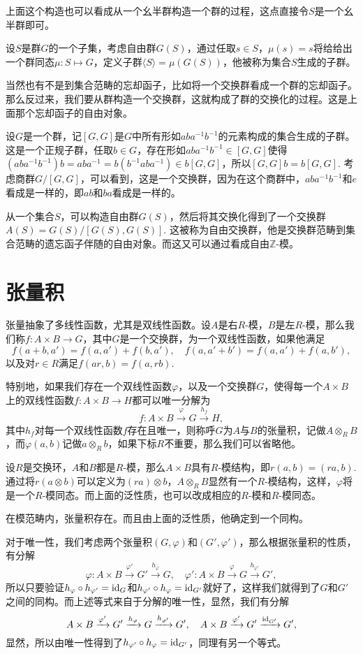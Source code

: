 上面这个构造也可以看成从一个幺半群构造一个群的过程，这点直接令$S$是一个幺半群即可。

\para 设$S$是群$G$的一个子集，考虑自由群$G(S)$，通过任取$s\in S$，$\mu(s)=s$将给给出一个群同态$\mu:S\mapsto G$，定义子群$\langle S\rangle=\mu(G(S))$，他被称为集合$S$生成的子群。

\para 当然也有不是到集合范畴的忘却函子，比如将一个交换群看成一个群的忘却函子。那么反过来，我们要从群构造一个交换群，这就构成了群的交换化的过程。这是上面那个忘却函子的自由对象。

设$G$是一个群，记$[G,G]$是$G$中所有形如$aba^{-1}b^{-1}$的元素构成的集合生成的子群。这是一个正规子群，任取$b\in G$，存在形如$aba^{-1}b^{-1}\in [G,G]$使得$(aba^{-1}b^{-1})b=aba^{-1}=b(b^{-1}aba^{-1})\in b[G,G]$，所以$[G,G]b=b[G,G]$. 考虑商群$G/[G,G]$，可以看到，这是一个交换群，因为在这个商群中，$aba^{-1}b^{-1}$和$e$看成是一样的，即$ab$和$ba$看成是一样的。

从一个集合$S$，可以构造自由群$G(S)$，然后将其交换化得到了一个交换群$A(S)=G(S)/[G(S),G(S)]$. 这被称为自由交换群，他是交换群范畴到集合范畴的遗忘函子伴随的自由对象。而这又可以通过看成自由$\mathbb{Z}$-模。

\section{张量积}

\para 张量抽象了多线性函数，尤其是双线性函数。设$A$是右$R$-模，$B$是左$R$-模，那么我们称$f:A\times B\to G$，其中$G$是一个交换群，为一个双线性函数，如果他满足
\[
	f(a+b,a')=f(a,a')+f(b,a'),\quad f(a,a'+b')=f(a,a')+f(a,b'),
\]
以及对$r\in R$满足$f(ar,b)=f(a,rb)$.

特别地，如果我们存在一个双线性函数$\varphi$，以及一个交换群$G$，使得每一个$A\times B$上的双线性函数$f:A\times B\to H$都可以唯一分解为
\[
	f:A\times B\xrightarrow{\varphi} G\xrightarrow{h_f}H,
\]
其中$h_f$对每一个双线性函数$f$存在且唯一，则称呼$G$为$A$与$B$的张量积，记做$A\otimes_R B$，而$\varphi(a,b)$记做$a\otimes_R b$，如果下标$R$不重要，那么我们可以省略他。

设$R$是交换环，$A$和$B$都是$R$-模，那么$A\times B$具有$R$-模结构，即$r(a,b)=(ra,b)$. 通过将$r(a\otimes b)$可以定义为$(ra)\otimes b$，$A\otimes_R B$显然有一个$R$-模结构，这样，$\varphi$将是一个$R$-模同态。而上面的泛性质，也可以改成相应的$R$-模和$R$-模同态。

\lem 在模范畴内，张量积存在。而且由上面的泛性质，他确定到一个同构。

\proof 对于唯一性，我们考虑两个张量积$(G,\varphi)$和$(G',\varphi')$，那么根据张量积的性质，有分解
\[
	\varphi:A\times B\xrightarrow{\varphi'} G'\xrightarrow{h_{\varphi}}G,\quad \varphi':A\times B\xrightarrow{\varphi} G\xrightarrow{h_{\varphi'}}G',
\]
所以只要验证$h_\varphi\circ h_{\varphi'}=\operatorname{id}_{G}$和$h_{\varphi'}\circ h_{\varphi}=\operatorname{id}_{G'}$就好了，这样我们就得到了$G$和$G'$之间的同构。而上述等式来自于分解的唯一性，显然，我们有分解
\[
	A\times B\xrightarrow{\varphi'} G'\xrightarrow{h_{\varphi}}G\xrightarrow{h_{\varphi'}}G',\quad A\times B\xrightarrow{\varphi'} G'\xrightarrow{\operatorname{id}_{G'}}G',
\]
显然，所以由唯一性得到了$h_{\varphi'}\circ h_{\varphi}=\operatorname{id}_{G'}$，同理有另一个等式。

